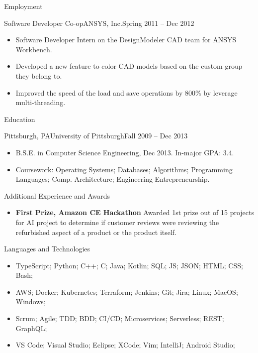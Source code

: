 \documentclass[]{mussocv}
\begin{document}
\begin{cvsection}{Employment}
		\begin{cvsubsection}{Software Developer Co-op}{ANSYS, Inc.}{Spring 2011 -- Dec 2012}
			\begin{itemize}
				\item Software Developer Intern on the DesignModeler CAD team for ANSYS Workbench. 
				\item Developed a new feature to color CAD models based on the custom group they belong to.
				\item Improved the speed of the load and save operations by 800\% by leverage multi-threading.
			\end{itemize}
		\end{cvsubsection}
	\end{cvsection}
	
	\begin{cvsection}{Education}
		\begin{cvsubsection}{Pittsburgh, PA}{University of Pittsburgh}{Fall 2009 -- Dec 2013}
			\begin{itemize}
				\item B.S.E. in Computer Science Engineering, Dec 2013.  In-major GPA: 3.4.
				\item Coursework: Operating Systems; Databases; Algorithms; Programming Languages; Comp. Architecture; Engineering Entrepreneurship.
			\end{itemize}
		\end{cvsubsection}
	\end{cvsection}
	
	\begin{cvsection}{Additional Experience and Awards}
		\begin{cvsubsection}{}{}{}	
			\begin{itemize}
				\item \textbf{First Prize, Amazon CE Hackathon} Awarded 1st prize out of 15 projects for AI project to determine if customer reviews were reviewing the refurbished aspect of a product or the product itself.
			\end{itemize}
		\end{cvsubsection}
	\end{cvsection}
	
	\begin{cvsection}{Languages and Technologies}
		\begin{cvsubsection}{}{}{}	
			\begin{itemize}
				\item TypeScript; Python; C++; C; Java; Kotlin; SQL; JS; JSON; HTML; CSS; Bash;
				\item AWS; Docker; Kubernetes; Terraform; Jenkins; Git; Jira; Linux; MacOS; Windows;
				\item Scrum; Agile; TDD; BDD; CI/CD; Microservices; Serverless; REST; GraphQL;
				\item VS Code; Visual Studio; Eclipse; XCode; Vim; IntelliJ; Android Studio;
			\end{itemize}
		\end{cvsubsection}
	\end{cvsection}
	
\end{document}
